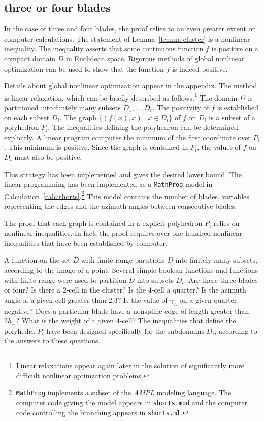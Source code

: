 \subsection{three or four blades}\label{sec:3or4}

In the case of three and four blades, the proof relies to an even greater extent on computer calculations.  The statement of Lemma~\ref{lemma:cluster} is a nonlinear inequality.   The inequality asserts that some continuous function $f$ is positive on a compact domain $D$ in Euclidean space.  Rigorous methods of global nonlinear optimization can be used to show that the function $f$ is indeed positive.  

Details about global nonlinear optimization appear in the appendix.   The method is linear relaxation, which can be briefly described as follows.\footnote{Linear relaxations appear again later in the solution of significantly more difficult nonlinear optimzation problems.}  The domain $D$ is partitioned into finitely many subsets $D_1,\ldots, D_r$.   The positivity of $f$ is
established on each subset $D_i$.    The graph $\{(f(x), x)\mid x\in D_i\}$ 
of $f$ on $D_i$ is a subset of a polyhedron $P_i$.  The inequalities defining the polyhedron can be determined explicitly.    A linear program computes the minimum of the first coordinate over $P_i$.  This
minimum is positive.  Since the graph is contained in $P_i$, the values of $f$ on $D_i$ must also be
positive.

This strategy has been implemented and gives the desired lower bound.  
The linear programming has been implemented as a  
{\tt MathProg} model in Calculation~\ref{calc:shorts}.\footnote{{\tt MathProg} implements a subset of the {\it AMPL} modeling language.  The computer code giving the model appears in {\tt shorts.mod} and the computer code controlling the branching appears in {\tt shorts.ml}.}  This model contains the number of blades, variables representing the edges and the azimuth angles between consecutive blades.

The proof that each graph is contained in a explicit polyhedron $P_i$ relies on nonlinear inequalities.
In fact, the proof requires over one hundred nonlinear inequalities that have been established by computer.    

A function on the set $D$ with finite range partitions $D$ into finitely many subsets, according to the image of a point.   Several simple boolean functions and functions with finite range were used to partition
 $D$ into subsets $D_i$: Are there three blades or four?  Is there a $2$-cell in the cluster?  Is the $4$-cell a quarter?   Is the    azimuth angle  of a given cell greater than $2.3$?  Is the value of $\gamma_L$ on a given quarter  negative? Does a particular blade have a nonspline edge of length greater than $2h_-$?  What is the weight of a given $4$-cell?  The inequalities that define the polyhedra $P_i$ have been designed specifically for the subdomains $D_i$, according to the answers to these questions.

